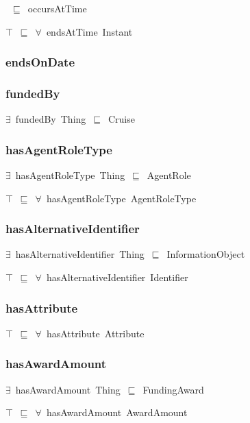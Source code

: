 \documentclass{article}
\begin{document}
~\ensuremath{\sqsubseteq}~occursAtTime

\ensuremath{\top}~\ensuremath{\sqsubseteq}~\ensuremath{\forall}~endsAtTime~Instant

\subsubsection*{endsOnDate}

\subsubsection*{fundedBy}

\ensuremath{\exists}~fundedBy~Thing~\ensuremath{\sqsubseteq}~Cruise

\subsubsection*{hasAgentRoleType}

\ensuremath{\exists}~hasAgentRoleType~Thing~\ensuremath{\sqsubseteq}~AgentRole

\ensuremath{\top}~\ensuremath{\sqsubseteq}~\ensuremath{\forall}~hasAgentRoleType~AgentRoleType

\subsubsection*{hasAlternativeIdentifier}

\ensuremath{\exists}~hasAlternativeIdentifier~Thing~\ensuremath{\sqsubseteq}~InformationObject

\ensuremath{\top}~\ensuremath{\sqsubseteq}~\ensuremath{\forall}~hasAlternativeIdentifier~Identifier

\subsubsection*{hasAttribute}

\ensuremath{\top}~\ensuremath{\sqsubseteq}~\ensuremath{\forall}~hasAttribute~Attribute

\subsubsection*{hasAwardAmount}

\ensuremath{\exists}~hasAwardAmount~Thing~\ensuremath{\sqsubseteq}~FundingAward

\ensuremath{\top}~\ensuremath{\sqsubseteq}~\ensuremath{\forall}~hasAwardAmount~AwardAmount
\end{document}

